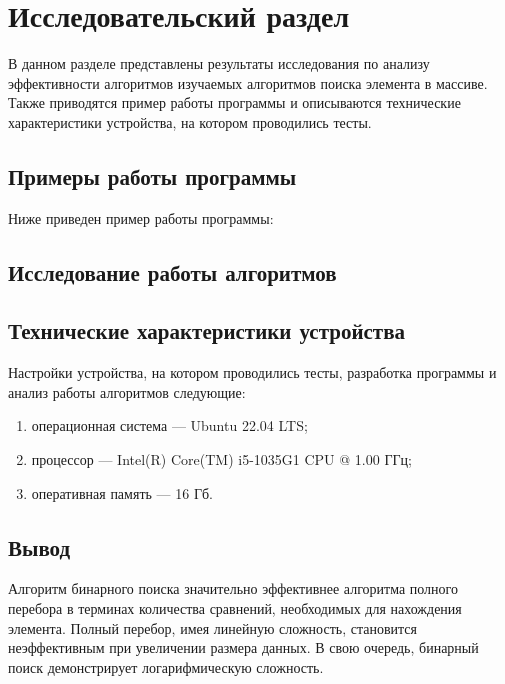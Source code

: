\chapter{Исследовательский раздел}

В данном разделе представлены результаты исследования по анализу эффективности алгоритмов изучаемых алгоритмов поиска элемента в массиве. Также приводятся пример работы программы и описываются технические характеристики устройства, на котором проводились тесты.

\section{Примеры работы программы}
Ниже приведен пример работы программы:
\clearpage

\section{Исследование работы алгоритмов}

\FloatBarrier
{}
\FloatBarrier
{}
\FloatBarrier

\section{Технические характеристики устройства}

Настройки устройства, на котором проводились тесты, разработка программы и анализ работы алгоритмов следующие:

\begin{enumerate}[label=\arabic*)]
	\item операционная система --- Ubuntu 22.04 LTS;
	\item процессор --- Intel(R) Core(TM) i5-1035G1 CPU @ 1.00 ГГц;
	\item оперативная память --- 16 Гб.
\end{enumerate}

\section{Вывод}
Алгоритм бинарного поиска значительно эффективнее алгоритма полного перебора в терминах количества сравнений, необходимых для нахождения элемента. Полный перебор, имея линейную сложность, становится неэффективным при увеличении размера данных. В свою очередь, бинарный поиск демонстрирует логарифмическую сложность.

